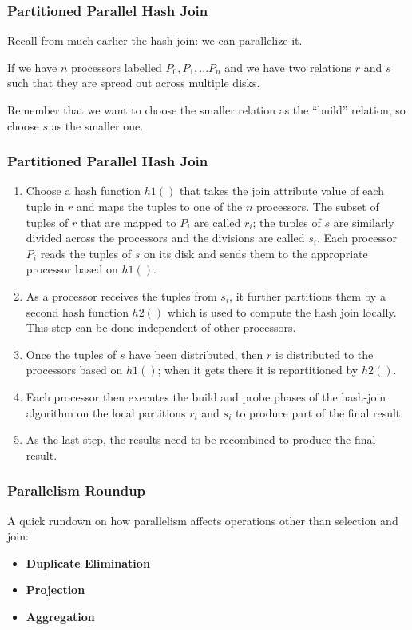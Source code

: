 \begin{frame}
\frametitle{Partitioned Parallel Hash Join}

Recall from much earlier the hash join: we can parallelize it. 

If we have $n$ processors labelled $P_{0}, P_{1}, ... P_{n}$ and we have two relations $r$ and $s$ such that they are spread out across multiple disks. 

Remember that we want to choose the smaller relation as the ``build'' relation, so choose $s$ as the smaller one.

\end{frame}

\begin{frame}
\frametitle{Partitioned Parallel Hash Join}

\begin{enumerate}
	\item Choose a hash function $h1()$ that takes the join attribute value of each tuple in $r$ and maps the tuples to one of the $n$ processors. The subset of tuples of $r$ that are mapped to $P_{i}$ are called $r_{i}$; the tuples of $s$ are similarly divided across the processors and the divisions are called $s_{i}$. Each processor $P_{i}$ reads the tuples of $s$ on its disk and sends them to the appropriate processor based on $h1()$.
	\item As a processor receives the tuples from $s_{i}$, it further partitions them by a second hash function $h2()$ which is used to compute the hash join locally. This step can be done independent of other processors.
	\item Once the tuples of $s$ have been distributed, then $r$ is distributed to the processors based on $h1()$; when it gets there it is repartitioned by $h2()$.
	\item Each processor then executes the build and probe phases of the hash-join algorithm on the local partitions $r_{i}$ and $s_{i}$ to produce part of the final result.
	\item As the last step, the results need to be recombined to produce the final result.
\end{enumerate}

\end{frame}


\begin{frame}
\frametitle{Parallelism Roundup}

A quick rundown on how parallelism affects operations other than selection and join:
\begin{itemize}
\item \textbf{Duplicate Elimination}
\item \textbf{Projection}
\item \textbf{Aggregation}
\end{itemize}

\end{frame}

